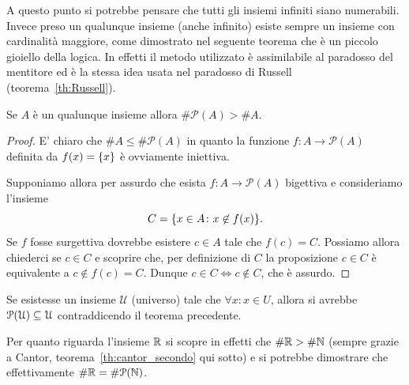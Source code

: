 A questo punto si potrebbe pensare che
tutti gli insiemi infiniti siano numerabili.
Invece preso un qualunque insieme (anche infinito)
esiste sempre un insieme con cardinalità maggiore,
come dimostrato nel seguente teorema che è un piccolo gioiello della logica.
In effetti il metodo utilizzato è assimilabile al paradosso del mentitore 
ed è la stessa idea usata nel paradosso di Russell (teorema~\ref{th:Russell}).
%
%
\begin{theorem}[Cantor]%
%
%
\label{th:Cantor}%
  Se $A$ è un qualunque insieme allora $\# \mathcal P(A) > \# A$.
\end{theorem}
%
\begin{proof}
  E' chiaro che $\# A \le \#\mathcal P(A)$ in quanto 
  la funzione $f\colon A \to \mathcal P(A)$ definita da $f(x)=\ENCLOSE{x}$
  è ovviamente iniettiva.

  Supponiamo allora per assurdo che esista $f\colon A\to \mathcal P(A)$
  bigettiva e consideriamo l'insieme 
  \[
    C = \ENCLOSE{x\in A \colon x\not\in f(x)}.  
  \]
  Se $f$ fosse surgettiva dovrebbe esistere $c\in A$ tale che $f(c) = C$.
  Possiamo allora chiederci se $c\in C$ e scoprire che, 
  per definizione di $C$ la proposizione $c\in C$ è equivalente 
  a $c\not\in f(c) = C$. 
  Dunque $c\in C \iff c\not\in C$, che è assurdo.
\end{proof}
%
\begin{corollary}
  Se esistesse un insieme $\mathcal U$ (universo) 
  tale che $\forall x\colon x \in U$, allora 
  si avrebbe $\mathcal \P(\mathcal U) \subset \mathcal U$
  contraddicendo il teorema precedente.
\end{corollary}
%
Per quanto riguarda l'insieme $\RR$ si
scopre in effetti che $\#\RR > \#\NN$
(sempre grazie a Cantor, teorema~\ref{th:cantor_secondo} qui sotto)
e si potrebbe dimostrare che effettivamente $\#\RR = \#\mathcal P(\NN)$.

